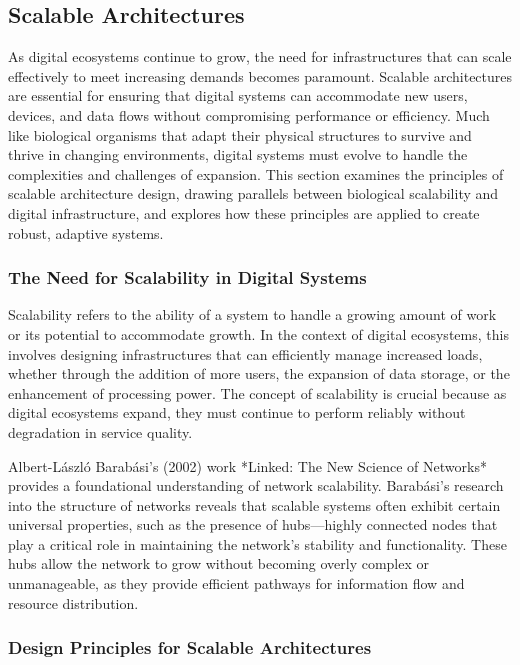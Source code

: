 \documentclass[12pt,twoside]{article}
\begin{document}
\subsection{Scalable Architectures}

As digital ecosystems continue to grow, the need for infrastructures that can scale effectively to meet increasing demands becomes paramount. Scalable architectures are essential for ensuring that digital systems can accommodate new users, devices, and data flows without compromising performance or efficiency. Much like biological organisms that adapt their physical structures to survive and thrive in changing environments, digital systems must evolve to handle the complexities and challenges of expansion. This section examines the principles of scalable architecture design, drawing parallels between biological scalability and digital infrastructure, and explores how these principles are applied to create robust, adaptive systems.

\subsubsection{The Need for Scalability in Digital Systems}

Scalability refers to the ability of a system to handle a growing amount of work or its potential to accommodate growth. In the context of digital ecosystems, this involves designing infrastructures that can efficiently manage increased loads, whether through the addition of more users, the expansion of data storage, or the enhancement of processing power. The concept of scalability is crucial because as digital ecosystems expand, they must continue to perform reliably without degradation in service quality.

Albert-László Barabási’s (2002) work *Linked: The New Science of Networks* provides a foundational understanding of network scalability. Barabási’s research into the structure of networks reveals that scalable systems often exhibit certain universal properties, such as the presence of hubs—highly connected nodes that play a critical role in maintaining the network’s stability and functionality. These hubs allow the network to grow without becoming overly complex or unmanageable, as they provide efficient pathways for information flow and resource distribution.

\subsubsection{Design Principles for Scalable Architectures}
\end{document}
